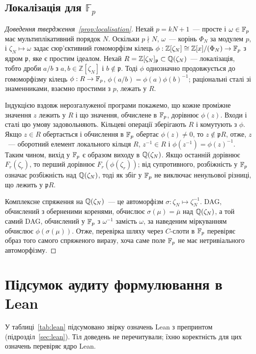 \documentclass[11pt]{article}
\theoremstyle{plain}
\newcommand{\Z}{\mathbb{Z}}
\begin{document}
\subsection{Локалізація для \texorpdfstring{$\mathbb{F}_p$}{Fp}}\label{app:localisation}
\begin{proof}[Доведення твердження~\ref{prop:localisation}]
Нехай $p=kN+1$~--- просте і $\omega\in\mathbb{F}_p$ має мультиплікативний порядок $N$. Оскільки $p\nmid N$, $\omega$~--- корінь $\Phi_N$ за модулем $p$, і $\zeta_N\mapsto\omega$ задає сюр'єктивний гомоморфізм кілець $\phi:\Z[\zeta_N]\cong\Z[x]/(\Phi_N)\to\Fp$ з ядром $\mathfrak p$, яке є простим ідеалом. Нехай $R=\Z[\zeta_N]_{\mathfrak p}\subset\Q(\zeta_N)$~--- локалізація, тобто дроби $a/b$ з $a,b\in\Z[\zeta_N]$ і $b\notin\mathfrak p$. Тоді $\phi$ однозначно продовжується до гомоморфізму кілець $\phi:R\to\mathbb{F}_p$, $\phi(a/b)=\phi(a)\phi(b)^{-1}$; раціональні сталі зі знаменниками, взаємно простими з $p$, лежать у $R$.

Індукцією вздовж нерозгалуженої програми покажемо, що кожне проміжне значення $z$ лежить у $R$ і що значення, обчислене в $\mathbb{F}_p$, дорівнює $\phi(z)$. Входи і сталі цю умову задовольняють. Кільцеві операції зберігають $R$ і комутують з $\phi$. Якщо $z\in R$ обертається і обчислення в $\mathbb{F}_p$ обертає $\phi(z)\ne0$, то $z\notin\mathfrak pR$, отже, $z$~--- оборотний елемент локального кільця $R$, $z^{-1}\in R$ і $\phi(z^{-1})=\phi(z)^{-1}$. Таким чином, вихід у $\mathbb{F}_p$ є образом виходу в $\mathbb{Q}(\zeta_N)$. Якщо останній дорівнює $F_r(\zeta_r)$, то перший дорівнює $F_r(\phi(\zeta_r))$; від супротивного, розбіжність у $\mathbb{F}_p$ означає розбіжність над $\mathbb{Q}(\zeta_N)$, тоді як збіг у $\mathbb{F}_p$ не виключає ненульової різниці, що лежить у $\mathfrak pR$.

Комплексне спряження на $\mathbb{Q}(\zeta_N)$~--- це автоморфізм $\sigma:\zeta_N\mapsto\zeta_N^{-1}$. DAG, обчислений з оберненими коренями, обчислює $\sigma(\mu)=\bar\mu$ над $\mathbb{Q}(\zeta_N)$, а той самий DAG, обчислений у $\mathbb{F}_p$ з $\omega^{-1}$ замість $\omega$, за наведеним міркуванням обчислює $\phi(\sigma(\mu))$. Отже, перевірка шляху через $C$-слоти в $\mathbb{F}_p$ перевіряє образ того самого спряженого виразу, хоча саме поле $\mathbb{F}_p$ не має нетривіального автоморфізму.
\end{proof}

\section{Підсумок аудиту формулювання в Lean}\label{app:lean}
У таблиці~\ref{tab:lean} підсумовано звірку означень Lean з препринтом (підрозділ~\ref{sec:lean}). Тіл доведень не перечитували; їхню коректність для цих означень перевіряє ядро Lean.
\end{document}

